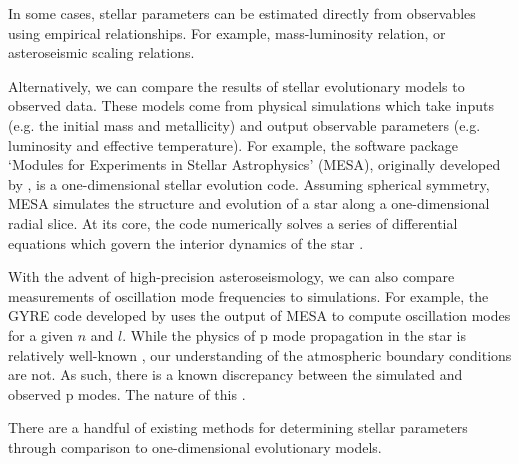 In some cases, stellar parameters can be estimated directly from observables using empirical relationships. For example, mass-luminosity relation, or asteroseismic scaling relations.

Alternatively, we can compare the results of stellar evolutionary models to observed data. These models come from physical simulations which take inputs (e.g. the initial mass and metallicity) and output observable parameters (e.g. luminosity and effective temperature). For example, the software package `Modules for Experiments in Stellar Astrophysics' (MESA), originally developed by \citet{Paxton.Bildsten.ea2011}, is a one-dimensional stellar evolution code. Assuming spherical symmetry, MESA simulates the structure and evolution of a star along a one-dimensional radial slice. At its core, the code numerically solves a series of differential equations which govern the interior dynamics of the star \citep[see e.g.][]{Kippenhahn.Weigert.ea2013}.

With the advent of high-precision asteroseismology, we can also compare measurements of oscillation mode frequencies to simulations. For example, the GYRE code developed by \citet{Townsend.Teitler2013} uses the output of MESA to compute oscillation modes for a given \(n\) and \(l\). While the physics of p mode propagation in the star is relatively well-known \citep[see e.g.][]{Aerts.Christensen-Dalsgaard.ea2010}, our understanding of the atmospheric boundary conditions are not. As such, there is a known discrepancy between the simulated and observed p modes. The nature of this \citep{Ball.Gizon2014}.

There are a handful of existing methods for determining stellar parameters through comparison to one-dimensional evolutionary models. 




